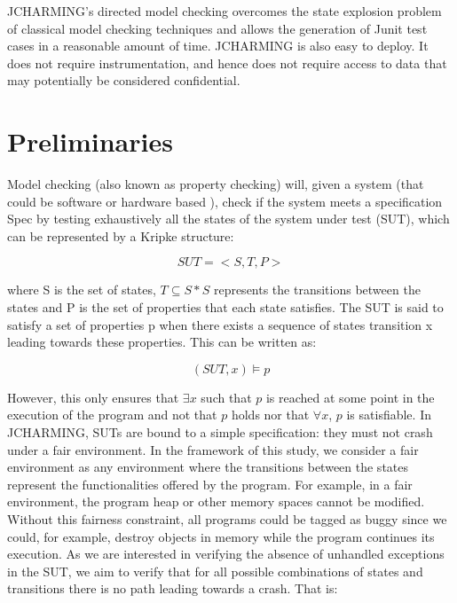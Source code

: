 \documentclass[times]{smrauth}
\begin{document}
JCHARMING's directed model checking overcomes the state explosion problem of classical model checking techniques and allows the generation of Junit test cases in a reasonable amount of time. JCHARMING is also easy to deploy. It does not require instrumentation, and hence does not require access to data that may potentially be considered confidential. 


\section{Preliminaries\label{sec:prelimenaries}}

Model checking (also known as property checking) will, given a system (that could be software \cite{Visser2003} or hardware based \cite{kropf1999introduction}), check if the system meets a specification Spec by testing exhaustively all the states of the system under test (SUT), which can be represented by a Kripke \cite{Kripke1963} structure:

\begin{equation}
SUT = <S,T,P>
\end{equation}

where S is the set of states, $T \subseteq S * S$ represents the transitions between the states and P is the set of properties that each state satisfies. The SUT is said to satisfy a set of properties p when there exists a sequence of states transition x leading towards these properties. This can be written as:

\begin{equation}
(SUT, x)  \models p
\end{equation}

However, this only ensures that $\exists x$ such that $p$ is reached at some point in the execution of the program and not that $p$ holds nor that $\forall x$, $p$ is satisfiable. In JCHARMING, SUTs are bound to a simple specification: they must not crash under a fair environment. In the framework of this study, we consider a fair environment as any environment where the transitions between the states represent the functionalities offered by the program. For example, in a fair environment, the program heap or other memory spaces cannot be modified. Without this fairness constraint, all programs could be tagged as buggy since we could, for example, destroy objects in memory while the program continues its execution. As we are interested in verifying the absence of unhandled exceptions in the SUT, we aim to verify that for all possible combinations of states and transitions there is no path leading towards a crash. That is:
\end{document}
